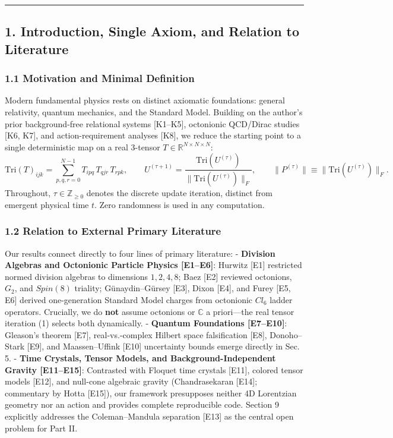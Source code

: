 \documentclass[
  a4paper,
]{article}
\begin{document}
\begin{center}\rule{0.5\linewidth}{0.5pt}\end{center}

\subsection{1. Introduction, Single Axiom, and Relation to
Literature}\label{introduction-single-axiom-and-relation-to-literature}

\subsubsection{1.1 Motivation and Minimal
Definition}\label{motivation-and-minimal-definition}

Modern fundamental physics rests on distinct axiomatic foundations:
general relativity, quantum mechanics, and the Standard Model. Building
on the author's prior background-free relational systems {[}K1--K5{]},
octonionic QCD/Dirac studies {[}K6, K7{]}, and action-requirement
analyses {[}K8{]}, we reduce the starting point to a single
deterministic map on a real 3-tensor
\(T \in \mathbb{R}^{N\times N\times N}\):
\[\mathrm{Tri}(T)_{ijk} = \sum_{p,q,r=0}^{N-1} T_{ipq}\, T_{qjr}\, T_{rpk}, \qquad U^{(\tau+1)} = \frac{\mathrm{Tri}(U^{(\tau)})}{\|\mathrm{Tri}(U^{(\tau)})\|_F}, \qquad \|P^{(\tau)}\| \equiv \|\mathrm{Tri}(U^{(\tau)})\|_F. \tag{1}\]
Throughout, \(\tau \in \mathbb{Z}_{\ge 0}\) denotes the discrete update
iteration, distinct from emergent physical time \(t\). Zero randomness
is used in any computation.

\subsubsection{1.2 Relation to External Primary
Literature}\label{relation-to-external-primary-literature}

Our results connect directly to four lines of primary literature: -
\textbf{Division Algebras and Octonionic Particle Physics {[}E1--E6{]}}:
Hurwitz {[}E1{]} restricted normed division algebras to dimensions
\(1, 2, 4, 8\); Baez {[}E2{]} reviewed octonions, \(G_2\), and
\(Spin(8)\) triality; Günaydin--Gürsey {[}E3{]}, Dixon {[}E4{]}, and
Furey {[}E5, E6{]} derived one-generation Standard Model charges from
octonionic \(Cl_6\) ladder operators. Crucially, we do \textbf{not}
assume octonions or \(\mathbb{C}\) a priori---the real tensor iteration
(1) selects both dynamically. - \textbf{Quantum Foundations
{[}E7--E10{]}}: Gleason's theorem {[}E7{]}, real-vs.-complex Hilbert
space falsification {[}E8{]}, Donoho--Stark {[}E9{]}, and
Maassen--Uffink {[}E10{]} uncertainty bounds emerge directly in Sec. 5.
- \textbf{Time Crystals, Tensor Models, and Background-Independent
Gravity {[}E11--E15{]}}: Contrasted with Floquet time crystals
{[}E11{]}, colored tensor models {[}E12{]}, and null-cone algebraic
gravity (Chandrasekaran {[}E14{]}; commentary by Hotta {[}E15{]}), our
framework presupposes neither 4D Lorentzian geometry nor an action and
provides complete reproducible code. Section 9 explicitly addresses the
Coleman--Mandula separation {[}E13{]} as the central open problem for
Part II.
\end{document}
